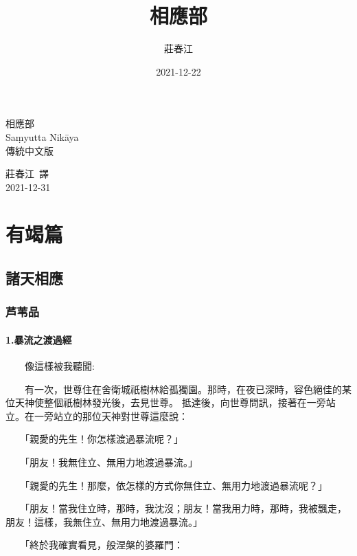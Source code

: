 \documentclass[12pt,oneside]{book}
\title{相應部}
\author{莊春江}
\date{2021-12-22}
\newcommand{\mycite}[1]{\textsuperscript{\cite{#1}}}
\newcommand{\HRule}{\rule{\linewidth}{0.5mm}}
\begin{document}
\begin{titlepage}
\begin{center}
\null \vspace{2cm}
{\fontsize{130}{140}\selectfont \fontSansTC 相應部}
\\[0.5cm]
{\fontsize{45}{55}\selectfont \fontSansD Saṃyutta Nikāya}
\\[1.5cm]

{\Huge 傳統中文版}
\\ \vspace{0.5em}

\vfill

{\Large 莊春江\ 譯}
\\ \vspace{0.5em}
{\Large 2021-12-31}

\end{center}
\end{titlepage}

\part{有竭篇}

\chapter{諸天相應}
\section{芦苇品}

\subsection{1.暴流之渡過經}
　　像這樣被我聽聞:\mycite{g1}

　　有一次，世尊住在舍衛城祇樹林給孤獨園。那時，在夜已深時，容色絕佳的某位天神使整個祇樹林發光後，去見世尊。
抵達後，向世尊問訊，接著在一旁站立。在一旁站立的那位天神對世尊這麼說：

　　「親愛的先生！你怎樣渡過暴流呢？」

　　「朋友！我無住立、無用力地渡過暴流。」

　　「親愛的先生！那麼，依怎樣的方式你無住立、無用力地渡過暴流呢？」

　　「朋友！當我住立時，那時，我沈沒；朋友！當我用力時，那時，我被飄走，朋友！這樣，我無住立、無用力地渡過暴流。」

　　「終於我確實看見，般涅槃的婆羅門：
\end{document}

